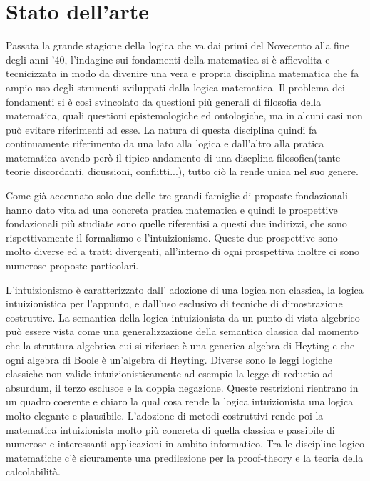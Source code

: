 \section{Stato dell'arte}

Passata la grande stagione della logica che va dai primi del Novecento
alla fine degli anni '40, l'indagine sui fondamenti della matematica
si è affievolita e tecnicizzata in modo da divenire una vera e propria
disciplina matematica che fa ampio uso degli strumenti sviluppati
dalla logica matematica. Il problema dei fondamenti si è così svincolato
da questioni più generali di filosofia della matematica, quali questioni
epistemologiche ed ontologiche, ma in alcuni casi non può evitare
riferimenti ad esse. La natura di questa disciplina quindi fa continuamente
riferimento da una lato alla logica e dall'altro alla pratica matematica
avendo però il tipico andamento di una discplina filosofica(tante
teorie discordanti, dicussioni, conflitti...), tutto ciò la rende
unica nel suo genere.

Come già accennato solo due delle tre grandi famiglie di proposte
fondazionali hanno dato vita ad una concreta pratica matematica e
quindi le prospettive fondazionali più studiate sono quelle riferentisi
a questi due indirizzi, che sono rispettivamente il formalismo e l'intuizionismo.
Queste due prospettive sono molto diverse ed a tratti divergenti,
all'interno di ogni prospettiva inoltre ci sono numerose proposte
particolari.

L'intuizionismo è caratterizzato dall' adozione di una logica non
classica, la logica intuizionistica per l'appunto, e dall'uso esclusivo
di tecniche di dimostrazione costruttive. La semantica della logica
intuizionista da un punto di vista algebrico può essere vista come
una generalizzazione della semantica classica dal momento che la struttura
algebrica cui si riferisce è una generica algebra di Heyting e che
ogni algebra di Boole è un'algebra di Heyting. Diverse sono le leggi
logiche classiche non valide intuizionisticamente ad esempio la legge
di reductio ad absurdum, il terzo esclusoe e la doppia negazione.
Queste restrizioni rientrano in un quadro coerente e chiaro la qual
cosa rende la logica intuizionista una logica molto elegante e plausibile.
L'adozione di metodi costruttivi rende poi la matematica intuizionista
molto più concreta di quella classica e passibile di numerose e interessanti
applicazioni in ambito informatico. Tra le discipline logico matematiche
c'è sicuramente una predilezione per la proof-theory e la teoria della
calcolabilità.

